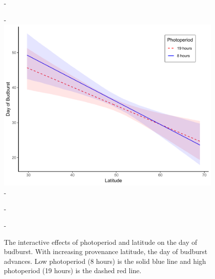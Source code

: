 \documentclass{article}\usepackage[]{graphicx}\usepackage[]{color}
\begin{document}
{\begin{figure} [H]
  -\begin{center}
  -\includegraphics[width=14cm]{..//figures/LatxPhoto_allspp.pdf}
  -\caption{ The interactive effects of photoperiod and latitude on the day of budburst. With increasing provenance latitude, the day of budburst advances. Low photoperiod (8 hours) is the solid blue line and high photoperiod (19 hours) is the dashed red line. }\label{fig:intrxn}
  -\end{center}
  -\end{figure}}
  
\end{document}
